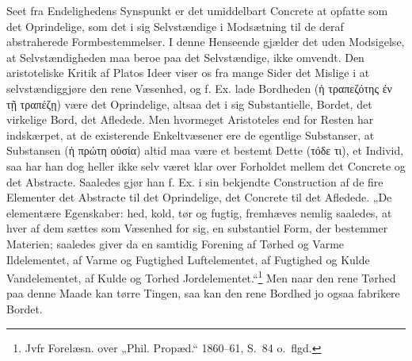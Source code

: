 \documentclass[11pt]{book}
\begin{document}
Seet fra Endelighedens Synspunkt er det umiddelbart Concrete at opfatte
som det Oprindelige, som det i sig Selvstændige i Modsætning til de deraf
abstraherede Formbestemmelser. I denne Henseende gjælder det uden
Modsigelse, at Selvstændigheden maa beroe paa det Selvstændige, ikke
omvendt. Den aristoteliske Kritik af Platos Ideer viser os fra mange
Sider det Mislige i at selvstændiggjøre den rene Væsenhed, og f. Ex.
lade Bordheden (ἡ τραπεζότης ἐν τῇ τραπέζῃ) være det Oprindelige, altsaa
det i sig Substantielle, Bordet, det virkelige Bord, det Afledede. Men
hvormeget Aristoteles end for Resten har indskærpet, at de existerende
Enkeltvæsener ere de egentlige Substanser, at Substansen (ἡ πρώτη οὐσία)
altid maa være et bestemt Dette (τόδε τι), et Individ, saa har han dog
heller ikke selv været klar over Forholdet mellem det Concrete og det
Abstracte. Saaledes gjør han f. Ex. i sin bekjendte Construction af de
fire Elementer det Abstracte til det Oprindelige, det Concrete til det
Afledede. „De elementære Egenskaber: hed, kold, tør og fugtig, fremhæves
nemlig saaledes, at hver af dem sættes som Væsenhed for sig, en
substantiel Form, der bestemmer Materien; saaledes giver da en samtidig
Forening af Tørhed og Varme Ildelementet, af Varme og Fugtighed
Luftelementet, af Fugtighed og Kulde Vandelementet, af Kulde og Torhed
Jordelementet.“\footnote{Jvfr Forelæsn. over „Phil. Propæd.“ 1860--61,
S.\ 84 o.\ flgd.}
Men naar den rene Tørhed paa denne Maade kan tørre Tingen, saa kan den
rene Bordhed jo ogsaa fabrikere Bordet.
\end{document}

